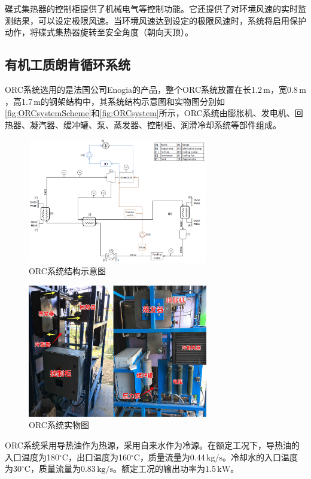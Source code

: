 碟式集热器的控制柜提供了机械电气等控制功能。它还提供了对环境风速的实时监测结果，可以设定极限风速。当环境风速达到设定的极限风速时，系统将启用保护动作，将碟式集热器旋转至安全角度（朝向天顶）。

\subsection{有机工质朗肯循环系统}
ORC系统选用的是法国公司Enogia的产品，整个ORC系统放置在长1.2$\,\mathrm{m}$，宽0.8$\,\mathrm{m}$，高1.7$\,\mathrm{m}$的钢架结构中，其系统结构示意图和实物图分别如\autoref{fig:ORCsystemScheme}和\autoref{fig:ORCsystem}所示，ORC系统由膨胀机、发电机、回热器、凝汽器、缓冲罐、泵、蒸发器、控制柜、润滑冷却系统等部件组成。
\begin{figure}[!ht]
\centering
\includegraphics[width=0.7\textwidth]{fig/ORCsystemScheme.jpg}
\caption{ORC系统结构示意图}
\label{fig:ORCsystemScheme}
\end{figure}
\begin{figure}[!ht]
\centering
\includegraphics[width=0.7\textwidth]{fig/ORCsystem.jpg}
\caption{ORC系统实物图}
\label{fig:ORCsystem}
\end{figure}

ORC系统采用导热油作为热源，采用自来水作为冷源。在额定工况下，导热油的入口温度为180$\mathrm{^\circ C}$，出口温度为160$\mathrm{^\circ C}$，质量流量为0.44$\,\mathrm{kg/s}$。冷却水的入口温度为30$\mathrm{^\circ C}$，质量流量为0.83$\,\mathrm{kg/s}$。额定工况的输出功率为1.5$\,\mathrm{kW}$。

